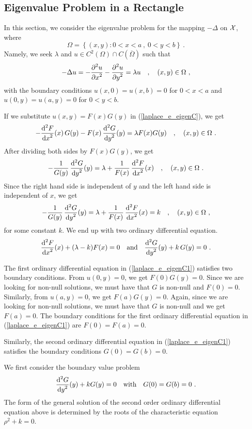\subsection{Eigenvalue Problem in a Rectangle}

In this section, we consider the eigenvalue problem for the mapping
$-\Delta$ on $\cal X$, where
\[
  \Omega =\left\{ (x,y) : 0 < x < a\ ,\ 0 < y < b \right\} \ .
\]
Namely, we seek $\lambda$ and
$u \in C^2(\Omega)\cap C(\overline{\Omega})$ such that
\begin{equation} \label{laplace_e_eigenC}
-\Delta u = -\frac{\displaystyle \partial^{2}{u}} {\displaystyle \partial x^{2}} - \frac{\displaystyle \partial^{2}{u}} {\displaystyle \partial y^{2}} = \lambda u
\quad , \quad (x,y) \in \Omega \ ,
\end{equation}
with the boundary conditions $u(x,0) = u(x,b) = 0$ for $0<x<a$ and
$u(0,y) = u(a,y) = 0$ for $0<y<b$.

If we substitute $u(x,y) = F(x)G(y)$ in (\ref{laplace_e_eigenC}), we get
\[
-\frac{\displaystyle \mathrm{d}^{2}{F}} {\displaystyle \mathrm{d}{x}^{2}}(x)\, G(y) - F(x)\,\frac{\displaystyle \mathrm{d}^{2}{G}} {\displaystyle \mathrm{d}{y}^{2}}(y) = \lambda
F(x)G(y) \quad , \quad (x,y) \in \Omega \ .
\]
After dividing both sides by $F(x)G(y)$, we get
\[
-\frac{1}{G(y)} \, \frac{\displaystyle \mathrm{d}^{2}{G}} {\displaystyle \mathrm{d}{y}^{2}}(y) =
\lambda + \frac{1}{F(x)}\,\frac{\displaystyle \mathrm{d}^{2}{F}} {\displaystyle \mathrm{d}{x}^{2}}(x)
\quad , \quad (x,y) \in \Omega \ .
\]
Since the right hand side is independent of $y$ and the left hand side
is independent of $x$, we get
\[
-\frac{1}{G(y)} \, \frac{\displaystyle \mathrm{d}^{2}{G}} {\displaystyle \mathrm{d}{y}^{2}}(y) = \lambda + \frac{1}{F(x)}\,
\frac{\displaystyle \mathrm{d}^{2}{F}} {\displaystyle \mathrm{d}{x}^{2}}(x) = k \quad , \quad (x,y) \in \Omega \ ,
\]
for some constant $k$.  We end up with two ordinary differential equation.
\begin{equation} \label{laplace_e_eigenC1}
\frac{\displaystyle \mathrm{d}^{2}{F}} {\displaystyle \mathrm{d}{x}^{2}}(x) + (\lambda-k) F(x) = 0 \quad \text{and}
\quad \frac{\displaystyle \mathrm{d}^{2}{G}} {\displaystyle \mathrm{d}{y}^{2}}(y) + k\,G(y) = 0 \  .
\end{equation}

The first ordinary differential equation in
(\ref{laplace_e_eigenC1}) satisfies two boundary
conditions.   From $u(0,y) = 0$, we get $F(0)G(y)=0$.  Since we are
looking for non-null solutions, we must have that $G$ is
non-null and $F(0)=0$.  Similarly, from
$u(a,y) = 0$, we get $F(a)G(y)=0$.  Again, since we are
looking for non-null solutions, we must have that $G$ is
non-null and we get $F(a)=0$.  The boundary conditions for
the first ordinary differential equation in (\ref{laplace_e_eigenC1})
are $F(0)=F(a)=0$.

Similarly, the second ordinary differential equation in
(\ref{laplace_e_eigenC1}) satisfies the boundary conditions $G(0)=G(b)=0$.

We first consider the boundary value problem
\begin{equation} \label{laplace_e_eigenC2}
\dydxn{G}{y}{2}(y) + k G(y) = 0 \quad \text{with} \quad G(0)=G(b)=0 \ .
\end{equation}
The form of the general solution of the second order ordinary differential equation above is
determined by the roots of the characteristic equation $\rho^2 + k=0$.

